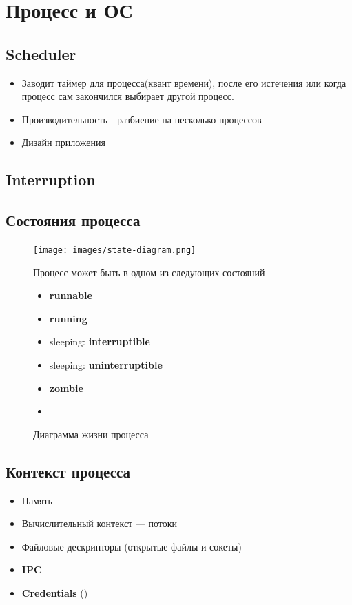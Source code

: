 \documentclass[../../lectures.tex]{subfiles}
\begin{document}
\section{Процесс и ОС}
\subsection{Scheduler}
\begin{itemize}
    \item Заводит таймер для процесса(квант времени), после его истечения 
    или когда процесс сам закончился выбирает другой процесс.

    \item Производительность - разбиение на несколько процессов

    \item Дизайн приложения
\end{itemize}
\subsection{Interruption}

\subsection{Состояния процесса}
\begin{figure}[H]
\begin{minipage}[c]{0.6\linewidth}
\centering
\texttt{[image: images/state-diagram.png]}
\caption{Диаграмма жизни процесса}
\end{minipage}
\begin{minipage}[c]{0.4\linewidth}
\centering
Процесс может быть в одном из следующих состояний
\begin{itemize}
    \item \textbf{runnable}
    \item \textbf{running}
    \item sleeping: \textbf{interruptible}
    \item sleeping: \textbf{uninterruptible}
    \item \textbf{zombie}
    \item {}
\end{itemize}
\end{minipage}
\end{figure}

\subsection{Контекст процесса}
\begin{itemize}
    \item Память
    \item Вычислительный контекст --- потоки
    \item Файловые дескрипторы (открытые файлы и сокеты)
    \item \textbf{IPC}
    \item \textbf{Credentials} ()
\end{itemize}
\end{document}
